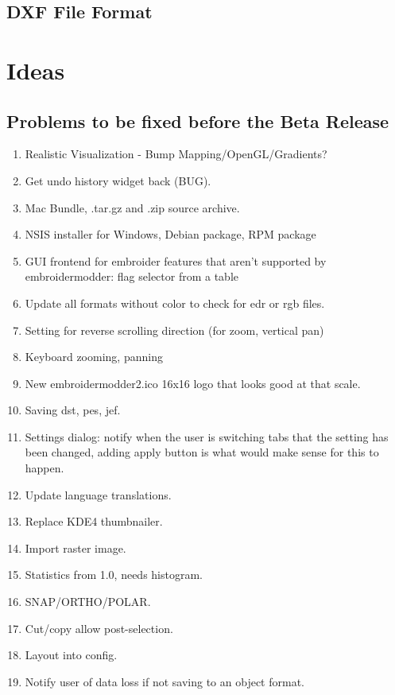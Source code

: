 \documentclass{report}
\begin{document}
\section{DXF File Format}

\cite{dxf_reference}

\chapter{Ideas}


\section{Problems to be fixed before the Beta Release}

\begin{enumerate}
\item Realistic Visualization - Bump Mapping/OpenGL/Gradients?
\item Get undo history widget back (BUG).
\item Mac Bundle, .tar.gz and .zip source archive.
\item NSIS installer for Windows, Debian package, RPM package
\item GUI frontend for embroider features that aren't supported by embroidermodder: flag selector from a table
\item Update all formats without color to check for edr or rgb files.
\item Setting for reverse scrolling direction (for zoom, vertical pan)
\item Keyboard zooming, panning
\item  New embroidermodder2.ico 16x16 logo that looks good at that scale.
\item Saving dst, pes, jef.
\item Settings dialog: notify when the user is switching tabs that the setting has been changed, adding apply button is what would make sense for this to happen.
\item Update language translations.
\item Replace KDE4 thumbnailer.
\item Import raster image.
\item Statistics from 1.0, needs histogram.
\item SNAP/ORTHO/POLAR.
\item Cut/copy allow post-selection.
\item Layout into config.
\item Notify user of data loss if not saving to an object format.

\end{enumerate}
\end{document}
